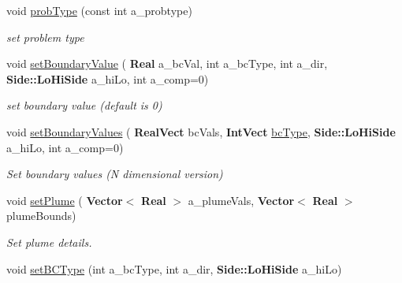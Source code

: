 \begin{DoxyCompactItemize}
\mbox{\label{class_advect_i_b_c_ab835398d8c5f12740518e69d47e8cad2}} 
void \hyperlink{class_advect_i_b_c_ab835398d8c5f12740518e69d47e8cad2}{prob\+Type} (const int a\+\_\+probtype)
\begin{DoxyCompactList}\small\item\em set problem type \end{DoxyCompactList}\item 
\mbox{\label{class_advect_i_b_c_a9d9cb1bf0ce09b8f4ce0429b850221a7}} 
void \hyperlink{class_advect_i_b_c_a9d9cb1bf0ce09b8f4ce0429b850221a7}{set\+Boundary\+Value} (\textbf{ Real} a\+\_\+bc\+Val, int a\+\_\+bc\+Type, int a\+\_\+dir, \textbf{ Side\+::\+Lo\+Hi\+Side} a\+\_\+hi\+Lo, int a\+\_\+comp=0)
\begin{DoxyCompactList}\small\item\em set boundary value (default is 0) \end{DoxyCompactList}\item 
\mbox{\label{class_advect_i_b_c_aa03fa005397fe7ba2f40dfd0e4762f66}} 
void \hyperlink{class_advect_i_b_c_aa03fa005397fe7ba2f40dfd0e4762f66}{set\+Boundary\+Values} (\textbf{ Real\+Vect} bc\+Vals, \textbf{ Int\+Vect} \hyperlink{class_advect_i_b_c_ad4d8474d7904dab87483522ebe711b8e}{bc\+Type}, \textbf{ Side\+::\+Lo\+Hi\+Side} a\+\_\+hi\+Lo, int a\+\_\+comp=0)
\begin{DoxyCompactList}\small\item\em Set boundary values (N dimensional version) \end{DoxyCompactList}\item 
\mbox{\label{class_advect_i_b_c_a559e2f450c3ccbff23ba713d508117d5}} 
void \hyperlink{class_advect_i_b_c_a559e2f450c3ccbff23ba713d508117d5}{set\+Plume} (\textbf{ Vector}$<$ \textbf{ Real} $>$ a\+\_\+plume\+Vals, \textbf{ Vector}$<$ \textbf{ Real} $>$ plume\+Bounds)
\begin{DoxyCompactList}\small\item\em Set plume details. \end{DoxyCompactList}\item 
\mbox{\label{class_advect_i_b_c_abeb87fbdca5e7f2711161712734c3f9e}} 
void \hyperlink{class_advect_i_b_c_abeb87fbdca5e7f2711161712734c3f9e}{set\+B\+C\+Type} (int a\+\_\+bc\+Type, int a\+\_\+dir, \textbf{ Side\+::\+Lo\+Hi\+Side} a\+\_\+hi\+Lo)

\end{DoxyCompactItemize}
